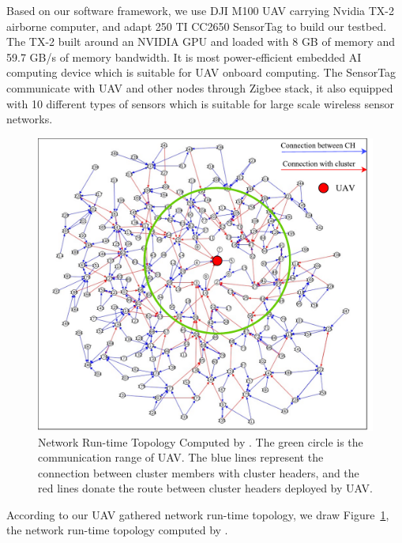 Based on our software framework, we use DJI M100 UAV carrying Nvidia TX-2 airborne
computer, and adapt 250 TI CC2650 SensorTag to build our testbed. The TX-2 built around an NVIDIA GPU 
and loaded with 8 GB of memory and 59.7 GB/s of memory bandwidth. It is most power-efficient embedded 
AI computing device which is suitable for UAV onboard computing. The SensorTag communicate with UAV and
other nodes through Zigbee stack, it also equipped with 10 different types of sensors which is suitable for 
large scale wireless sensor networks.

\begin{figure}[htbp]
	\centering
	\includegraphics[width=.85\columnwidth]{Figure/topology}
	\vspace{-0.1in}
	\caption{Network Run-time Topology Computed by {\sdn}. \textnormal{The green circle is the communication range of UAV. 
	The blue lines represent the connection between cluster members with cluster headers, and the red lines donate the route between cluster headers deployed by UAV. }}
	
	\label{topology}
	\vspace{-0.1in}
\end{figure}

According to our UAV gathered network run-time topology, we draw Figure~\ref{topology}, the network run-time topology computed by {\sdn}.

